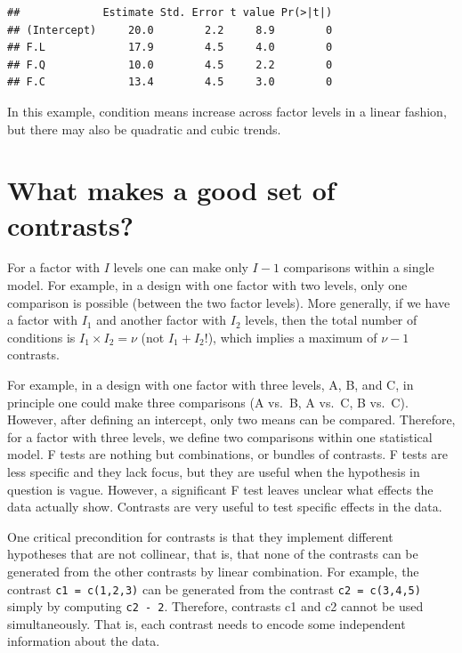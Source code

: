 \documentclass[
  12pt,
]{krantz}
\newenvironment{Shaded}{\begin{snugshade}}{\end{snugshade}}
\newcommand{\DecValTok}[1]{\textcolor[rgb]{0.00,0.00,0.81}{#1}}
\newcommand{\FunctionTok}[1]{\textcolor[rgb]{0.00,0.00,0.00}{#1}}
\newcommand{\NormalTok}[1]{#1}
\newcommand{\SpecialCharTok}[1]{\textcolor[rgb]{0.00,0.00,0.00}{#1}}
\theoremstyle{definition}
\theoremstyle{definition}
\theoremstyle{definition}
\theoremstyle{definition}
\theoremstyle{remark}
\begin{document}
\begin{Shaded}
\end{Shaded}

\begin{verbatim}
##             Estimate Std. Error t value Pr(>|t|)
## (Intercept)     20.0        2.2     8.9        0
## F.L             17.9        4.5     4.0        0
## F.Q             10.0        4.5     2.2        0
## F.C             13.4        4.5     3.0        0
\end{verbatim}

In this example, condition means increase across factor levels in a linear fashion, but there may also be quadratic and cubic trends.

\hypertarget{nonOrthogonal}{%
\section{What makes a good set of contrasts?}\label{nonOrthogonal}}

For a factor with \(I\) levels one can make only \(I-1\) comparisons within a single model. For example, in a design with one factor with two levels, only one comparison is possible (between the two factor levels). More generally, if we have a factor with \(I_1\) and another factor with \(I_2\) levels, then the total number of conditions is \(I_1\times I_2 = \nu\) (not \(I_1 + I_2\)!), which implies a maximum of \(\nu-1\) contrasts.

For example, in a design with one factor with three levels, A, B, and C, in principle one could make three comparisons (A vs.~B, A vs.~C, B vs.~C).
However, after defining an intercept, only two means can be compared. Therefore, for a factor with three levels, we define two comparisons within one statistical model.
F tests are nothing but combinations, or bundles of contrasts. F tests are less specific and they lack focus, but they are useful when the hypothesis in question is vague. However, a significant F test leaves unclear what effects the data actually show. Contrasts are very useful to test specific effects in the data.

One critical precondition for contrasts is that they implement different hypotheses that are not collinear, that is, that none of the contrasts can be generated from the other contrasts by linear combination. For example, the contrast \texttt{c1\ =\ c(1,2,3)} can be generated from the contrast \texttt{c2\ =\ c(3,4,5)} simply by computing \texttt{c2\ -\ 2}. Therefore, contrasts c1 and c2 cannot be used simultaneously. That is, each contrast needs to encode some independent information about the data.
\end{document}
